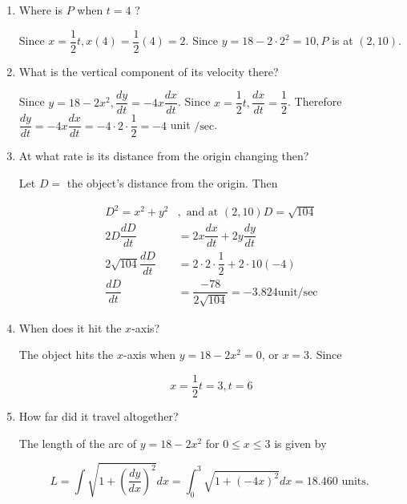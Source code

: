\begin{enumerate}
\renewcommand{\labelenumi}{(\alph{enumi})}
\item Where is $P$ when $t=4$ ?
\begin{solutionorbox}[1in]
Since $x=\dfrac{1}{2} t, x(4)=\dfrac{1}{2}(4)=2$. Since $y=18-2 \cdot 2^{2}=10, P$ is at $(2,10)$.
\end{solutionorbox}

\item What is the vertical component of its velocity there?
\begin{solutionorbox}[1.5in]
Since $y=18-2 x^{2}, \dfrac{d y}{d t}=-4 x \dfrac{d x}{d t}$. Since $x=\dfrac{1}{2} t, \dfrac{d x}{d t}=\dfrac{1}{2}$. Therefore $\dfrac{d y}{d t}=-4 x \dfrac{d x}{d t}=-4 \cdot 2 \cdot \dfrac{1}{2}=-4$ unit $/ \mathrm{sec}$.
\end{solutionorbox}

\item At what rate is its distance from the origin changing then?
\begin{solutionorbox}[2in]
Let $D=$ the object's distance from the origin. Then

\[
\begin{aligned}
D^{2}=x^{2}+y^{2} & , \text { and at }(2,10) D=\sqrt{104} \\
2 D \dfrac{d D}{d t} & =2 x \dfrac{d x}{d t}+2 y \dfrac{d y}{d t} \\
2 \sqrt{104} \dfrac{d D}{d t} & =2 \cdot 2 \cdot \dfrac{1}{2}+2 \cdot 10(-4) \\
\dfrac{d D}{d t} & =\dfrac{-78}{2 \sqrt{104}}=-3.824 \mathrm{unit} / \mathrm{sec}
\end{aligned}
\]
\end{solutionorbox}

\item When does it hit the $x$-axis?
\begin{solutionorbox}[1.5in]
The object hits the $x$-axis when $y=18-2 x^{2}=0$, or $x=3$. Since

\[
x=\dfrac{1}{2} t=3, t=6
\]
\end{solutionorbox}

\item How far did it travel altogether?
\begin{solutionorbox}[1.5in]
The length of the arc of $y=18-2 x^{2}$ for $0 \leq x \leq 3$ is given by

\[
L=\int \sqrt{1+\left(\dfrac{d y}{d x}\right)^{2}} d x=\int_{0}^{3} \sqrt{1+(-4 x)^{2}} d x=18.460 \text { units. }
\]
\end{solutionorbox}
\end{enumerate}






